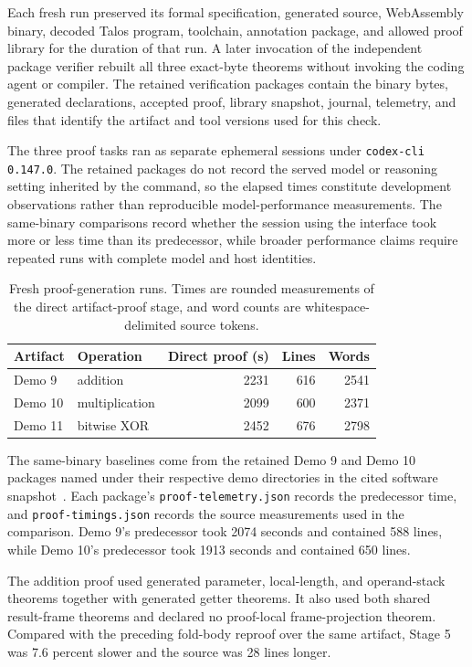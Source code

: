 \documentclass[10pt]{article}
\newcommand{\code}[1]{\texttt{#1}}
\begin{document}
Each fresh run preserved its formal specification, generated source, WebAssembly binary, decoded Talos program, toolchain, annotation package, and allowed proof library for the duration of that run.  A later invocation of the independent package verifier rebuilt all three exact-byte theorems without invoking the coding agent or compiler.  The retained verification packages contain the binary bytes, generated declarations, accepted proof, library snapshot, journal, telemetry, and files that identify the artifact and tool versions used for this check.

The three proof tasks ran as separate ephemeral sessions under \code{codex-cli 0.147.0}.  The retained packages do not record the served model or reasoning setting inherited by the command, so the elapsed times constitute development observations rather than reproducible model-performance measurements.  The same-binary comparisons record whether the session using the interface took more or less time than its predecessor, while broader performance claims require repeated runs with complete model and host identities.

\begin{table}[t]
\centering
\small
\begin{tabular}{l l r r r}
\toprule
Artifact & Operation & Direct proof (s) & Lines & Words \\
\midrule
Demo 9 & addition & 2231 & 616 & 2541 \\
Demo 10 & multiplication & 2099 & 600 & 2371 \\
Demo 11 & bitwise XOR & 2452 & 676 & 2798 \\
\bottomrule
\end{tabular}
\caption{Fresh proof-generation runs.  Times are rounded measurements of the direct artifact-proof stage, and word counts are whitespace-delimited source tokens.}
\label{tab:results}
\end{table}

The same-binary baselines come from the retained Demo 9 and Demo 10 packages named  under their respective demo directories in the cited software snapshot~\cite{LeanExeSoftware}.  Each package's \code{proof-telemetry.json} records the predecessor time, and \code{proof-timings.json} records the source measurements used in the comparison.  Demo 9's predecessor took 2074 seconds and contained 588 lines, while Demo 10's predecessor took 1913 seconds and contained 650 lines.

The addition proof used generated parameter, local-length, and operand-stack theorems together with generated getter theorems.  It also used both shared result-frame theorems and declared no proof-local frame-projection theorem.  Compared with the preceding fold-body reproof over the same artifact, Stage 5 was 7.6 percent slower and the source was 28 lines longer.
\end{document}
